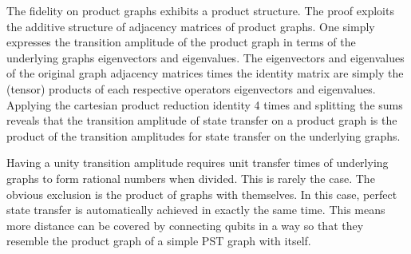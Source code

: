 
\begin{center}
\end{center}

\noindent The fidelity on product graphs exhibits a product structure. The proof exploits the additive structure of adjacency matrices of product graphs. One simply expresses the transition amplitude of the product graph in terms of the underlying graphs eigenvectors and eigenvalues. The eigenvectors and eigenvalues of the original graph adjacency matrices times the identity matrix are simply the (tensor) products of each respective operators eigenvectors and eigenvalues. Applying the cartesian product reduction identity 4 times and splitting the sums reveals that the transition amplitude of state transfer on a product graph is the product of the transition amplitudes for state transfer on the underlying graphs.\par
Having a unity transition amplitude requires unit transfer times of underlying graphs to form rational numbers when divided. This is rarely the case. The obvious exclusion is the product of graphs with themselves. In this case, perfect state transfer is automatically achieved in exactly the same time. This means more distance can be covered by connecting qubits in a way so that they resemble the product graph of a simple PST graph with itself.

